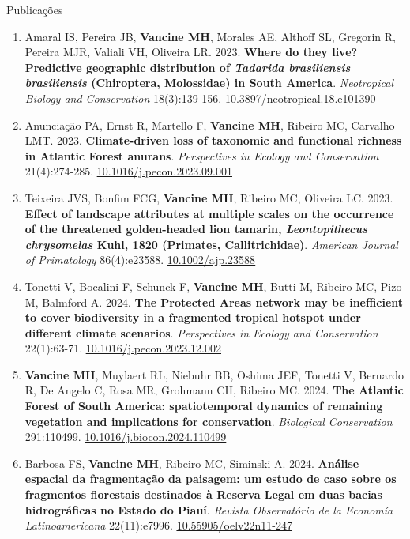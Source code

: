 \documentclass{resume}
\begin{document}
\begin{rSection}{Publicações}
\begin{enumerate}
\item Amaral IS, Pereira JB, {\bf Vancine MH}, Morales AE, Althoff SL, Gregorin R, Pereira MJR, Valiali VH, Oliveira LR. 2023. {\bf Where do they live? Predictive geographic distribution of \textbf{\textit{Tadarida brasiliensis brasiliensis}} (Chiroptera, Molossidae) in South America}. {\it Neotropical Biology and Conservation} 18(3):139-156. \href{https://doi.org/10.3897/neotropical.18.e101390}{\underline{10.3897/neotropical.18.e101390}}

\item Anunciação PA, Ernst R, Martello F, {\bf Vancine MH}, Ribeiro MC, Carvalho LMT. 2023. {\bf Climate-driven loss of taxonomic and functional richness in Atlantic Forest anurans}. {\it Perspectives in Ecology and Conservation} 21(4):274-285. \href{https://doi.org/10.1016/j.pecon.2023.09.001}{\underline{10.1016/j.pecon.2023.09.001}}

\item Teixeira JVS, Bonfim FCG, {\bf Vancine MH}, Ribeiro MC, Oliveira LC. 2023. {\bf Effect of landscape attributes at multiple scales on the occurrence of the threatened golden-headed lion tamarin, \textbf{\textit{Leontopithecus chrysomelas}} Kuhl, 1820 (Primates, Callitrichidae)}. {\it American Journal of Primatology} 86(4):e23588. \href{https://doi.org/10.1002/ajp.23588}{\underline{10.1002/ajp.23588}}

\item Tonetti V, Bocalini F, Schunck F, {\bf Vancine MH}, Butti M, Ribeiro MC, Pizo M, Balmford A. 2024. {\bf The Protected Areas network may be inefficient to cover biodiversity in a fragmented tropical hotspot under different climate scenarios}. {\it Perspectives in Ecology and Conservation} 22(1):63-71. \href{https://doi.org/10.1016/j.pecon.2023.12.002}{\underline{10.1016/j.pecon.2023.12.002}}

\item {\bf Vancine MH}, Muylaert RL, Niebuhr BB, Oshima JEF, Tonetti V, Bernardo R, De Angelo C, Rosa MR, Grohmann CH, Ribeiro MC. 2024. {\bf The Atlantic Forest of South America: spatiotemporal dynamics of remaining vegetation and implications for conservation}. {\it Biological Conservation} 291:110499. \href{https://doi.org/10.1016/j.biocon.2024.110499}{\underline{10.1016/j.biocon.2024.110499}}

\item Barbosa FS, {\bf Vancine MH}, Ribeiro MC, Siminski A. 2024. {\bf Análise espacial da fragmentação da paisagem: um estudo de caso sobre os fragmentos florestais destinados à Reserva Legal em duas bacias hidrográficas no Estado do Piauí}. {\it Revista Observatório de la Economía Latinoamericana} 22(11):e7996. \href{https://doi.org/10.55905/oelv22n11-247}{\underline{10.55905/oelv22n11-247}}


\end{enumerate}
\end{rSection}
\end{document}
